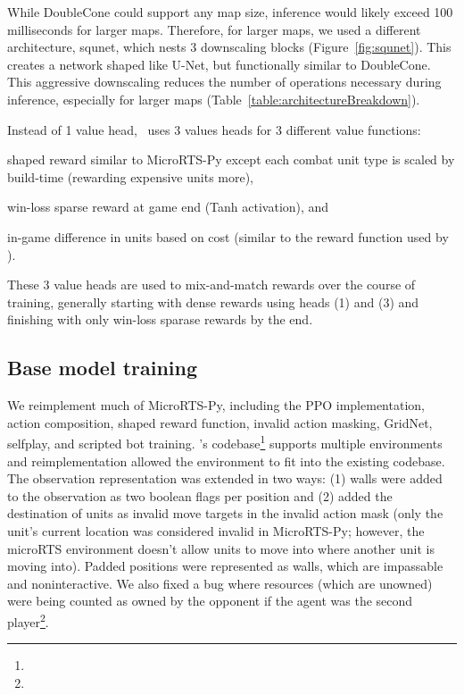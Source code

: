 \documentclass{article}
\begin{document}
While DoubleCone could support any map size, inference would likely exceed 100
milliseconds for larger maps. Therefore, for larger maps, we used a different
architecture, squnet, which nests 3 downscaling blocks (Figure~\ref{fig:squnet}). This 
creates a network shaped like U-Net, but functionally similar to DoubleCone.
This aggressive downscaling reduces the number of operations necessary during inference,
especially for larger maps (Table~\ref{table:architectureBreakdown}).

Instead of 1 value head, \agentName\ uses 3 values heads for 3 different value
functions:
\begin{inparaenum}[(1)]
    \item shaped reward similar to MicroRTS-Py except each combat unit type is
    scaled by build-time (rewarding expensive units more),
    \item win-loss sparse reward at game end (Tanh activation), and
    \item in-game difference in units based on cost (similar to the reward function used
    by \citet{Winter2021}).
\end{inparaenum}
These 3 value heads are used to mix-and-match rewards over the course of training,
generally starting with dense rewards using heads (1) and (3) and finishing with only
win-loss sparase rewards by the end.

\subsection{Base model training}
We reimplement much of MicroRTS-Py, including the PPO implementation, action
composition, shaped reward function, invalid action masking, GridNet, selfplay, and
scripted bot training. \agentName's codebase\footnote{\rlAlgoImplsGitHubUrl} supports 
multiple environments and reimplementation allowed the environment to fit into the 
existing codebase. The observation representation was extended in two ways: (1) walls 
were added to the observation as two boolean flags per position and (2) added the 
destination of units as invalid move targets in the invalid action mask (only the unit's current location was considered
invalid in MicroRTS-Py; however, the microRTS environment doesn't allow units to move into
where another unit is moving into). Padded positions were represented as walls, which
are impassable and noninteractive. We also fixed a bug where resources (which are unowned) were being counted as
owned by the opponent if the agent was the second player\footnote{\unownedFixGitHubCommit}.
\end{document}
